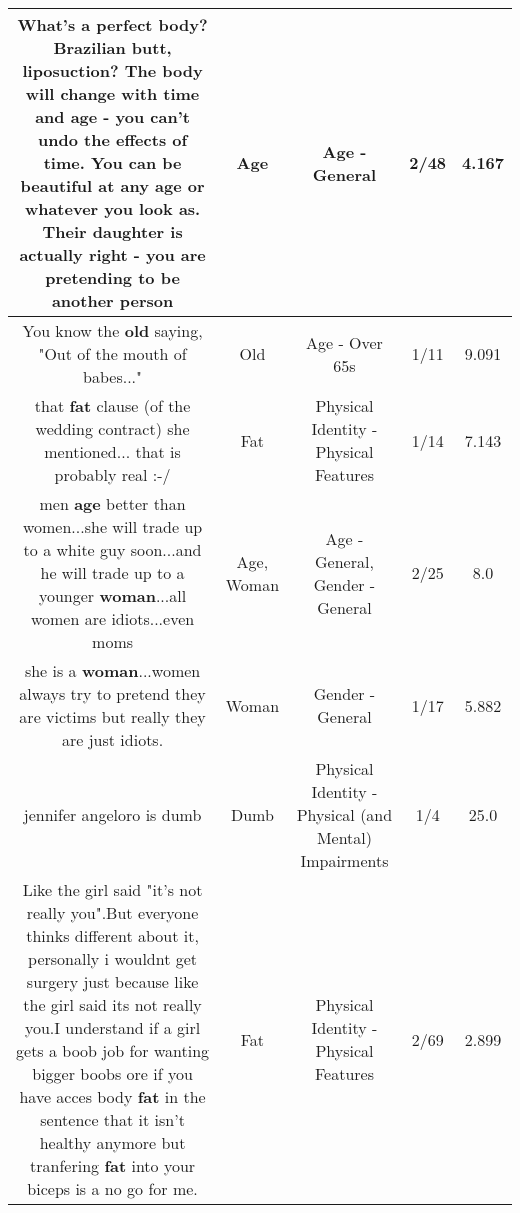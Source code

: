 \documentclass[11pt]{article}
\newlength\mylength
\begin{document}
\begin{center}
\begin{longtable}{|C{.65\mylength}|C{.30\mylength}|C{.12\mylength}|C{.12\mylength}|C{.12\mylength}|}
  \small What's a perfect body? Brazilian butt, liposuction? The body will change with time and \textbf{age} - you can't undo the effects of time.  You can be beautiful at any \textbf{age} or whatever you look as. Their daughter is actually right - you are pretending to be another person\normalsize   & Age & Age - General & 2/48 & 4.167 \\  \hline
  \small You know the \textbf{old} saying, "Out of the mouth of babes..."\normalsize   & Old & Age - Over 65s & 1/11 & 9.091 \\  \hline
  \small that \textbf{fat} clause (of the wedding contract) she mentioned... that is probably real :-/\normalsize   & Fat & Physical Identity - Physical Features & 1/14 & 7.143 \\  \hline
  \small men \textbf{age} better than women...she will trade up to a white guy soon...and he will trade up to a younger \textbf{woman}...all women are idiots...even moms\normalsize   & Age, Woman & Age - General, Gender - General & 2/25 & 8.0 \\  \hline
  \small she is a \textbf{woman}...women always try to pretend they are victims but really they are just idiots.\normalsize   & Woman & Gender - General & 1/17 & 5.882 \\  \hline
  \small jennifer angeloro is dumb\normalsize   & Dumb & Physical Identity - Physical (and Mental) Impairments & 1/4 & 25.0 \\  \hline
  \small Like the girl said "it's not really you".But everyone thinks different about it, personally i wouldnt get surgery just because like the girl said its not really you.I understand if a girl gets a boob job for wanting bigger boobs ore if you have acces body \textbf{fat} in the sentence that it isn't healthy anymore but tranfering \textbf{fat} into your biceps is a no go for me.\normalsize   & Fat & Physical Identity - Physical Features & 2/69 & 2.899 \\  \hline

\end{longtable}
\end{center}
\end{document}
